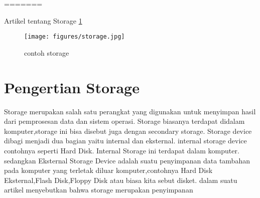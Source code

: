 =======







Artikel tentang Storage
\ref{storage}
\begin{figure}[ht]
\centerline{\texttt{[image: figures/storage.jpg]}}
\caption{contoh storage}
\label{storage}
\end{figure}





\section{Pengertian Storage}

Storage merupakan salah satu perangkat yang digunakan untuk menyimpan hasil dari pemprosesan data dan sistem operasi. Storage biasanya terdapat didalam komputer,storage ini bisa disebut juga dengan secondary storage.
Storage device dibagi menjadi dua bagian yaitu internal dan eksternal. internal storage device contohnya seperti Hard Disk. Internal Storage ini terdapat dalam komputer. sedangkan Eksternal Storage Device adalah suatu penyimpanan data tambahan pada komputer yang terletak diluar komputer,contohnya Hard Disk Eksternal,Flash Disk,Floppy Disk atau biasa kita sebut disket.
dalam suatu artikel menyebutkan bahwa storage merupakan penyimpanan \cite{weiser1999personal}

